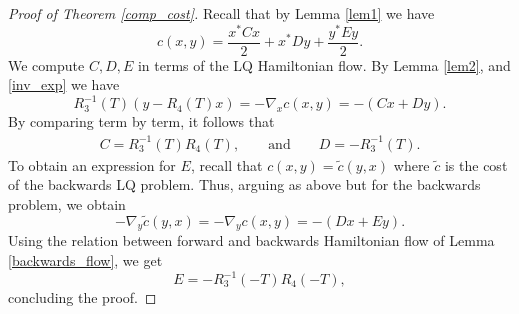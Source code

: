 \documentclass[reqno]{amsart}
\theoremstyle{plain}
\theoremstyle{definition}
\theoremstyle{remark}
\newtheorem{exmp}[thm]{Example}
\begin{document}
\begin{proof}[Proof of Theorem \ref{comp_cost}]
    Recall that by Lemma \ref{lem1} we have
    \begin{equation}
		c(x,y)=\frac{x^*Cx}{2}+x^*Dy+\frac{y^*Ey}{2}.
	\end{equation} 
    We compute $C,D,E$ in terms of the LQ Hamiltonian flow. By Lemma \ref{lem2}, and \eqref{inv_exp}  we have
\begin{equation}
    R_3^{-1}(T)(y-R_4(T)x) = -\nabla_x c(x,y) = -(Cx+Dy).
\end{equation}
 By comparing term by term, it follows that 
	\begin{align}
		C=R_3^{-1}(T)R_4(T), \qquad \text{and} \qquad
		D=-R_3^{-1}(T).
	\end{align}
     To obtain an expression for $E$, recall that $c(x,y) = \tilde{c}(y,x)$ where $\tilde{c}$ is the cost of the backwards LQ problem.        Thus, arguing as above but for the backwards problem, we obtain
    \begin{equation}
            -\nabla_y \tilde{c}(y,x) = -\nabla_y c(x,y)= -(Dx + Ey).
    \end{equation}
        Using the relation between forward and backwards Hamiltonian flow of Lemma \ref{backwards_flow}, we get
    \begin{equation}
        E = -R_3^{-1}(-T)R_4(-T),
    \end{equation}
    concluding the proof.
\end{proof}
\end{document}
